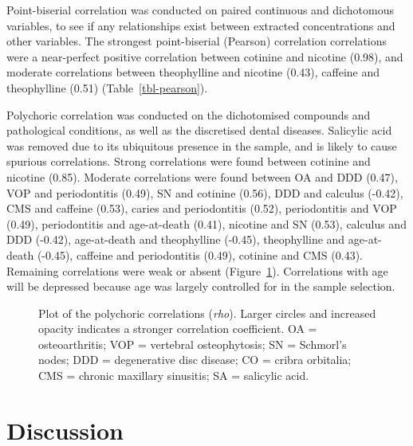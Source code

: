 \documentclass[
  b5paper,
]{book}
\begin{document}
Point-biserial correlation was conducted on paired continuous and
dichotomous variables, to see if any relationships exist between
extracted concentrations and other variables. The strongest
point-biserial (Pearson) correlation correlations were a near-perfect
positive correlation between cotinine and nicotine (0.98), and moderate
correlations between theophylline and nicotine (0.43), caffeine and
theophylline (0.51) (Table~\ref{tbl-pearson}).

Polychoric correlation was conducted on the dichotomised compounds and
pathological conditions, as well as the discretised dental diseases.
Salicylic acid was removed due to its ubiquitous presence in the sample,
and is likely to cause spurious correlations. Strong correlations were
found between cotinine and nicotine (0.85). Moderate correlations were
found between OA and DDD (0.47), VOP and periodontitis (0.49), SN and
cotinine (0.56), DDD and calculus (-0.42), CMS and caffeine (0.53),
caries and periodontitis (0.52), periodontitis and VOP (0.49),
periodontitis and age-at-death (0.41), nicotine and SN (0.53), calculus
and DDD (-0.42), age-at-death and theophylline (-0.45), theophylline and
age-at-death (-0.45), caffeine and periodontitis (0.49), cotinine and
CMS (0.43). Remaining correlations were weak or absent
(Figure~\ref{fig-polycorr}). Correlations with age will be depressed
because age was largely controlled for in the sample selection.

\begin{figure}


\caption{\label{fig-polycorr}Plot of the polychoric correlations
(\emph{rho}). Larger circles and increased opacity indicates a stronger
correlation coefficient. OA = osteoarthritis; VOP = vertebral
osteophytosis; SN = Schmorl's nodes; DDD = degenerative disc disease; CO
= cribra orbitalia; CMS = chronic maxillary sinusitis; SA = salicylic
acid.}

\end{figure}%

\section{Discussion}\label{discussion-2}
\end{document}
